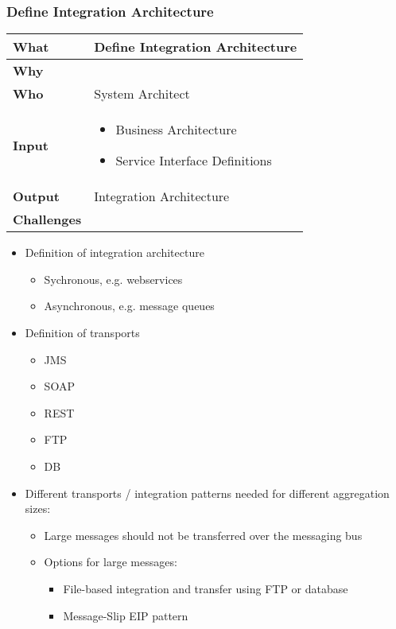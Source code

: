 \subsubsection{Define Integration Architecture}
\begin{minipage}{\textwidth}
 \label{table:ch6_Task_Define_Integration_Architecture}
\begin{tabular}
	{|m{3cm}|m{10cm}|} \hline \bfseries What & Define Integration Architecture\\
	\hline \bfseries Why & \\
	\hline \bfseries Who & System Architect\\
	\hline \bfseries Input & 
		\begin{itemize}
			\item Business Architecture
			\item Service Interface Definitions
		\end{itemize}
	\\
	\hline \bfseries Output & Integration Architecture\\
	\hline \bfseries Challenges & \\
	\hline 
\end{tabular}
\end{minipage}

\begin{itemize}
	\item Definition of integration architecture
	\begin{itemize}
		\item Sychronous, e.g. webservices
		\item Asynchronous, e.g. message queues
	\end{itemize}
	\item Definition of transports
	\begin{itemize}
		\item JMS
		\item SOAP
		\item REST
		\item FTP
		\item DB
	\end{itemize}
	\item Different transports / integration patterns needed for different aggregation sizes:
	\begin{itemize}
		\item Large messages should not be transferred over the messaging bus
		\item Options for large messages:
		\begin{itemize}
			\item File-based integration and transfer using FTP or database
			\item Message-Slip EIP pattern
		\end{itemize}
	\end{itemize}
\end{itemize}

